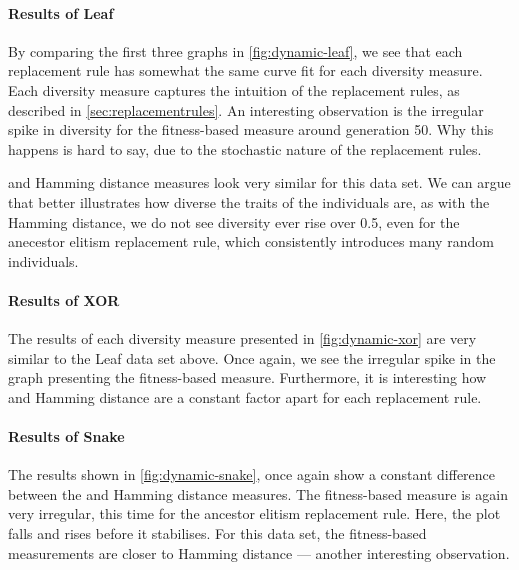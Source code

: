 \paragraph{Results of Leaf} By comparing the first three graphs in \cref{fig:dynamic-leaf}, we see that each replacement rule has somewhat the same curve fit for each diversity measure. Each diversity measure captures the intuition of the replacement rules, as described in \cref{sec:replacementrules}. An interesting observation is the irregular spike in diversity for the fitness-based measure around generation \num{50}. Why this happens is hard to say, due to the stochastic nature of the replacement rules.

\dia{} and Hamming distance measures look very similar for this data set. We can argue that \dia{} better illustrates how diverse the traits of the individuals are, as with the Hamming distance, we do not see diversity ever rise over \num{0.5}, even for the anecestor elitism replacement rule, which consistently introduces many random individuals. 



\paragraph{Results of XOR} The results of each diversity measure presented in \cref{fig:dynamic-xor} are very similar to the Leaf data set above. Once again, we see the irregular spike in the graph presenting the fitness-based measure. Furthermore, it is interesting how \dia{} and Hamming distance are a constant factor apart for each replacement rule.%



\paragraph{Results of Snake} The results shown in \cref{fig:dynamic-snake}, once again show a constant difference between the \dia{} and Hamming distance measures. The fitness-based measure is again very irregular, this time for the ancestor elitism replacement rule. Here, the plot falls and rises before it stabilises. For this data set, the fitness-based measurements are closer to Hamming distance --- another interesting observation.

